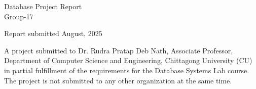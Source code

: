 \documentclass{article}
\begin{document}
\begin{titlepage}
\begin{center}
    {\large
      Database Project Report
    }\\
    \vspace{0.2cm}
    {\Large
      Group-17
    }
  \end{center}
  \vfill
  
  \begin{center}
  Report submitted August, 2025
  \end{center}
	\vfill
A project submitted to Dr. Rudra Pratap Deb Nath, Associate Professor, Department of Computer Science and Engineering, Chittagong University (CU) in partial fulfillment of the requirements for the Database Systems Lab course. The project is not submitted to any other organization at the same time. 

\end{titlepage}
\clearpage

\begin{table}[t]
\caption{Details of Group-17}
\end{table}
\clearpage
\end{document}
